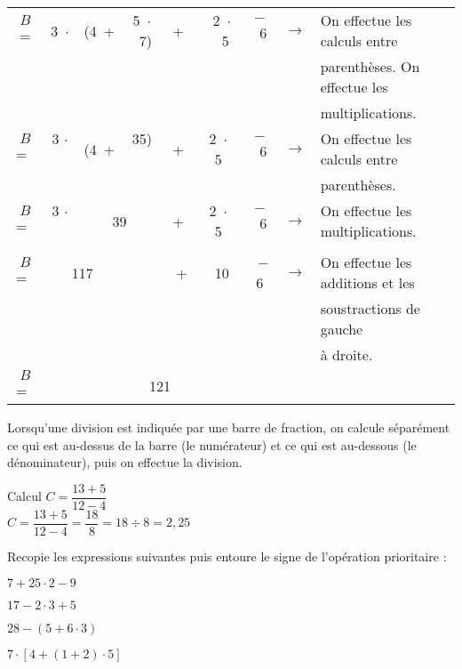 \begin{methode*1}
\begin{exemple*1}
\begin{center}
\begin{tabularx}{1.2\linewidth}{ccccccccX}
$B$=	 	& 3 $\cdot$	& (4 +	& 5 $\cdot$ 7)	& + & 2 $\cdot$  5	& $-$ 6	& $\rightarrow$ & On effectue les calculs entre \\ \cline{4-4}
&&&&&&&&  parenthèses. On effectue les\\
&&&&&&&& multiplications. \\
$B$= 	& 3 $\cdot$  	& (4 + 	&  35)  		&+ & 2 $\cdot$  5 	&$-$ 6  	& $\rightarrow$ & On effectue les calculs entre\\ \cline{3-4}
 &&&&&&&& parenthèses.\\
$B$= 	& 3 $\cdot$  	&    \multicolumn{2}{c}{39}      		     		& + & 2 $\cdot$  5 	&$-$ 6  	& $\rightarrow$ & On effectue les multiplications.\\ \cline{2-3}\cline{6-6}
 &&&&&&&& \\
$B$= 	&      		\multicolumn{2}{c}{117} &             			& +  & 10  			& $-$6  	& $\rightarrow$ & On effectue les additions et les \\ \cline{2-7}
 &&&&&&&& soustractions de gauche\\
 &&&&&&&& à droite.\\
$B$= 	&                \multicolumn{6}{c}{121}                             								&  & \\
\end{tabularx}
\end{center}
\end{exemple*1}


\begin{aconnaitre}
Lorsqu’une division est indiquée par une barre de fraction, on calcule séparément ce qui est au-dessus de la barre (le numérateur) et ce qui est au-dessous (le dénominateur), puis on effectue la division.
\end{aconnaitre} %

\begin{exemple*1}
Calcul $C = \dfrac{13 + 5}{12 - 4}$ \\[1em]
$C = \dfrac{13 + 5}{12 - 4} = \dfrac{18}{8} = 18 \div 8 = 2,25$
\end{exemple*1}

\exercice 
Recopie les expressions suivantes puis entoure le signe de l'opération prioritaire :
\begin{colenumerate}{2}
 \item $7 + 25 \cdot 2 - 9$
 \item $17 - 2 \cdot 3 + 5$
 \item $28 - (5 + 6 \cdot 3)$
 \item $7 \cdot [4  + (1 + 2) \cdot 5]$
 \end{colenumerate}


\end{methode*1}
